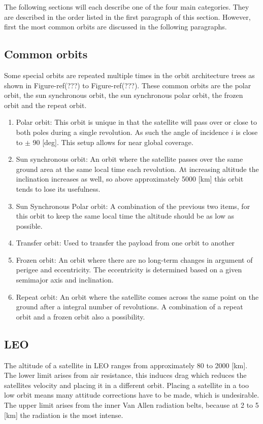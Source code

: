 The following sections will each describe one of the four main categories. They are described in the order listed in the first paragraph of this section. However, first the most common orbits are discussed in the following paragraphs.

\subsection {Common orbits}
\label{sec:blOrbCommon}
Some special orbits are repeated multiple times in the orbit architecture trees as shown in Figure-ref(???) to Figure-ref(???). These common orbits are the polar orbit, the sun synchronous orbit, the sun synchronous polar orbit, the frozen orbit and the repeat orbit.

\begin{enumerate}
	\item Polar orbit:
	This orbit is unique in that the satellite will pass over or close to both poles during a single revolution. As such the angle of incidence $i$ is close to  $\pm$ 90 [deg]. This setup allows for near global coverage.
	\item Sun synchronous orbit:
	An orbit where the satellite passes over the same ground area at the same local time each revolution. At increasing altitude the inclination increases as well, so above approximately 5000 [km]\cite{larson} this orbit tends to lose its usefulness. 
	\item Sun Synchronous Polar orbit:
	A combination of the previous two items, for this orbit to keep the same local time the altitude should be as low as possible.
	\item Transfer orbit:
	Used to transfer the payload from one orbit to another
	\item Frozen orbit:
	An orbit where there are no long-term changes in argument of perigee and eccentricity. The eccentricity is determined based on a given semimajor axis and inclination.
	\item Repeat orbit:
	An orbit where the satellite comes across the same point on the ground after a integral number of revolutions. A combination of a repeat orbit and a frozen orbit also a possibility.
\end{enumerate}

\subsection{LEO}
\label{sec:blOrb1}
The altitude of a satellite in \acs{LEO} ranges from approximately 80 to 2000 [km]\cite{nasaOrbit}. The lower limit arises from air resistance, this induces drag which reduces the satellites velocity and placing it in a different orbit. Placing a satellite in a too low orbit means many attitude corrections have to be made, which is undesirable. The upper limit arises from the inner Van Allen radiation belts, because at 2 to 5 [km]\cite{sse} the radiation is the most intense.

